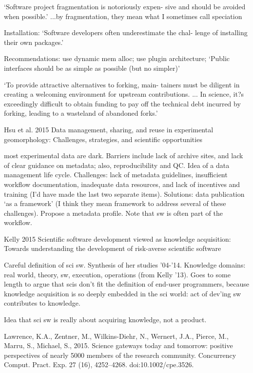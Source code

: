 \documentclass[12pt]{amsart}
\begin{document}
`Software project fragmentation is notoriously expen- sive and should be avoided when possible.' ...by fragmentation, they mean what I sometimes call speciation

Installation: `Software developers often underestimate the chal- lenge of installing their own packages.'

Recommendations: use dynamic mem alloc; use plugin architecture; `Public interfaces should be as simple as possible (but no simpler)'

`To provide attractive alternatives to forking, main- tainers must be diligent in creating a welcoming environment for upstream contributions. ... In science, it?s exceedingly difficult to obtain funding to pay off the technical debt incurred by forking, leading to a wasteland of abandoned forks.'






Hsu et al. 2015 Data management, sharing, and reuse in experimental geomorphology: Challenges, strategies, and scientific opportunities

most experimental data are dark. Barriers include lack of archive sites, and lack of clear guidance on metadata; also, reproducibility and QC. Idea of a data management life cycle. Challenges: lack of metadata guidelines, insufficient workflow documentation, inadequate data resources, and lack of incentives and training (I'd have made the last two separate items). Solutions: data publication `as a framework' (I think they mean framework to address several of these challenges). Propose a metadata profile. Note that sw is often part of the workflow.


Kelly 2015 Scientific software development viewed as knowledge acquisition: Towards understanding the development of risk-averse scientific software

Careful definition of sci sw. Synthesis of her studies '04-'14. Knowledge domains: real world, theory, sw, execution, operations (from Kelly '13). Goes to some length to argue that scis don't fit the definition of end-user programmers, because knowledge acquisition is so deeply embedded in the sci world: act of dev'ing sw contributes to knowledge. 

Idea that sci sw is really about acquiring knowledge, not a product.



Lawrence, K.A., Zentner, M., Wilkins-Diehr, N., Wernert, J.A., Pierce, M., Marru, S., Michael, S., 2015. Science gateways today and tomorrow: positive perspectives of nearly 5000 members of the research community. Concurrency Comput. Pract. Exp. 27 (16), 4252--4268. doi:10.1002/cpe.3526.
\end{document}
